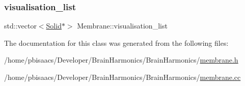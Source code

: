 \mbox{\label{classMembrane_a926d35c07f664b60deb6e9f87649fe89}} 
\subsubsection{\texorpdfstring{visualisation\+\_\+list}{visualisation\_list}}
{\footnotesize\ttfamily std\+::vector$<$\mbox{\hyperlink{classSolid}{Solid}}$\ast$$>$ Membrane\+::visualisation\+\_\+list\hspace{0.3cm}{\ttfamily [protected]}}



The documentation for this class was generated from the following files\+:\begin{DoxyCompactItemize}
\item 
/home/pbisaacs/\+Developer/\+Brain\+Harmonics/\+Brain\+Harmonics/\mbox{\hyperlink{membrane_8h}{membrane.\+h}}\item 
/home/pbisaacs/\+Developer/\+Brain\+Harmonics/\+Brain\+Harmonics/\mbox{\hyperlink{membrane_8cc}{membrane.\+cc}}\end{DoxyCompactItemize}
